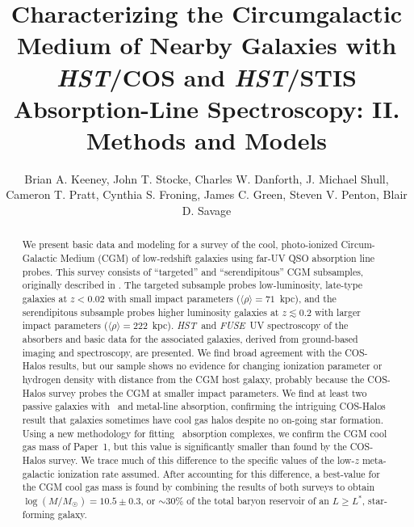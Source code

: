 \documentclass[twocolumn,twocolappendix,tighten,times]{aastex6}
\newcommand{\HI}{\ion{H}{1}}
\newcommand{\fuse}{{\sl FUSE}}
\newcommand{\hst}{{\sl HST}}
\begin{document}
\title{Characterizing the Circumgalactic Medium of Nearby Galaxies with \hst/COS and \hst/STIS Absorption-Line Spectroscopy: II. Methods and Models}

\author{Brian A. Keeney, John T. Stocke, Charles W. Danforth, J. Michael Shull,  Cameron T. Pratt, Cynthia S. Froning, James C. Green, Steven V. Penton, Blair D. Savage} 




\begin {abstract}
We present basic data and modeling for a survey of the cool, photo-ionized 
Circum-Galactic Medium (CGM) of low-redshift galaxies using far-UV QSO 
absorption line probes. This survey consists of ``targeted'' and 
``serendipitous'' CGM subsamples, originally described in 
\citet[Paper~1]{stocke13}. The targeted subsample probes low-luminosity, 
late-type galaxies at $z<0.02$ with small impact parameters 
($\langle\rho\rangle = 71$~kpc), and the serendipitous subsample probes 
higher luminosity galaxies at $z\lesssim0.2$ with larger impact parameters 
($\langle\rho\rangle = 222$~kpc). \hst\ and \fuse\ UV spectroscopy of the 
absorbers and basic data for the associated galaxies, derived from ground-based 
imaging and spectroscopy, are presented. We find broad agreement with the 
COS-Halos results, but our sample shows no evidence for changing ionization 
parameter or hydrogen density with distance from the CGM host galaxy, probably 
because the COS-Halos survey probes the CGM at smaller impact parameters. 
We find at least two passive galaxies with \HI\ and metal-line absorption, 
confirming the intriguing COS-Halos result that galaxies sometimes have cool 
gas halos despite no on-going star formation. Using a new methodology for 
fitting \HI\ absorption complexes, we confirm the CGM cool gas mass of Paper~1, 
but this value is significantly smaller than found by the COS-Halos survey. 
We trace much of this difference to the specific values of the low-$z$ 
meta-galactic ionization rate assumed. After accounting for this difference, 
a best-value for the CGM cool gas mass is found by combining the results of 
both surveys to obtain $\log{(M/M_{\Sun})}=10.5\pm0.3$, or $\sim30$\% of the 
total baryon reservoir of an $L \geq L^*$, star-forming galaxy.
\end {abstract}
\end{document}
